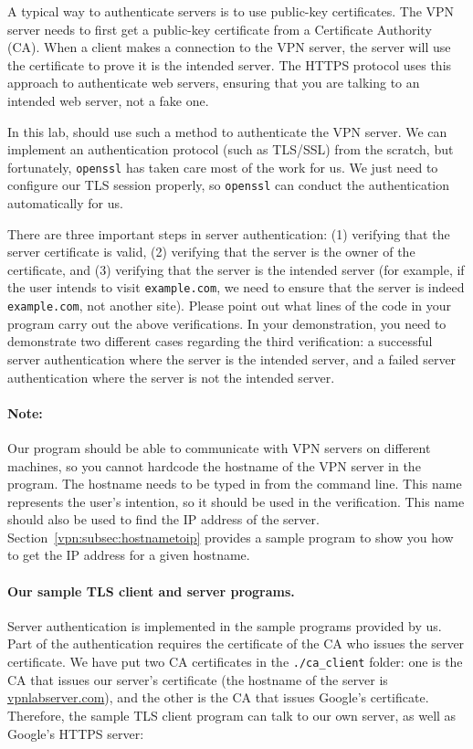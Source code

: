 A typical way to authenticate servers is to use public-key
certificates. The VPN server needs to first get a public-key 
certificate from a Certificate Authority (CA).
When a client makes a connection to the VPN 
server, the server will use the certificate to prove it 
is the intended server.  
The HTTPS protocol uses this approach to 
authenticate web servers, ensuring that you are talking to 
an intended web server, not a fake one. 


In this lab, \miniVPN should use such a method to authenticate the
VPN server. We can implement an authentication protocol (such
as TLS/SSL) from the scratch, but fortunately, \texttt{openssl} has 
taken care most of the work for us. We just need to configure 
our TLS session properly, so \texttt{openssl} can conduct the authentication
automatically for us.  

There are three important steps in server authentication: (1) verifying that
the server certificate is valid, (2) verifying that the server 
is the owner of the certificate, and (3) verifying that the server is
the intended server (for example, if the user intends to visit 
\texttt{example.com}, we need to ensure that the server is indeed 
\texttt{example.com}, not another site). Please point out what lines of the
code in your program carry out the above verifications. 
In your demonstration, you need to demonstrate two different cases regarding the 
third verification: a successful server authentication where the 
server is the intended server, and a failed server authentication where 
the server is not the intended server. 


\paragraph{Note:} Our \miniVPN program should be able to communicate with
VPN servers on different machines, so you cannot hardcode the hostname of 
the VPN server in the program. The hostname needs to be typed in from the
command line. This name represents the user's intention, so it should be
used in the verification. This name should also be used to find the IP
address of the server. Section~\ref{vpn:subsec:hostnametoip} provides a sample 
program to show you how to get the IP address for a given hostname. 


\paragraph{Our sample TLS client and server programs.} Server authentication
is implemented in the sample programs provided by us. Part of the authentication requires the
certificate of the CA who issues the server certificate. 
We have put two CA certificates in the \texttt{./ca\_client} folder: one is the 
CA that issues our server's certificate (the hostname of the server
is \url{vpnlabserver.com}), 
and the other is the CA that issues Google's certificate. 
Therefore, the sample TLS client program can talk to 
our own server, as well as Google's HTTPS server: 

